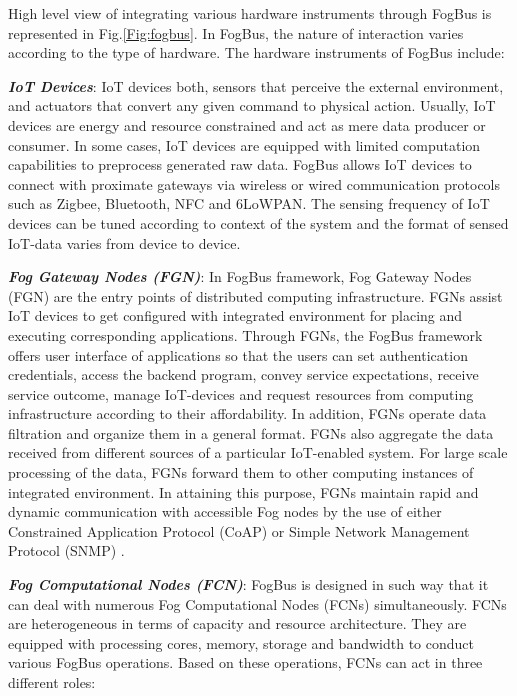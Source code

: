 \documentclass[final,5p,times,twocolumn]{elsarticle}
\begin{document}
%
High level view of integrating various hardware instruments through FogBus is represented in Fig.\ref{Fig:fogbus}. In FogBus, the nature of interaction varies according to the type of hardware. The hardware instruments of FogBus include:
\par \textbf{\textit{IoT Devices}}: IoT devices both, sensors that perceive the external environment, and actuators that convert any given command to physical action. Usually, IoT devices are energy and resource constrained and act as mere data producer or consumer. In some cases, IoT devices are equipped with limited computation capabilities to preprocess generated raw data. FogBus allows IoT devices to connect with proximate gateways via wireless or wired communication protocols such as Zigbee, Bluetooth, NFC and 6LoWPAN. The sensing frequency of IoT devices can be tuned according to context of the system and the format of sensed IoT-data varies from device to device.     
%  
\par \textbf{\textit{Fog Gateway Nodes (FGN)}}: In FogBus framework, Fog Gateway Nodes (FGN) are the entry points of distributed computing infrastructure. FGNs assist IoT devices to get configured with integrated environment for placing and executing corresponding applications. Through FGNs, the FogBus framework offers user interface of applications so that the users can set authentication credentials, access the backend program, convey service expectations, receive service outcome, manage IoT-devices and request resources from computing infrastructure according to their affordability. In addition, FGNs operate data filtration and organize them in a general format. FGNs also aggregate the data received from different sources of a particular IoT-enabled system. For large scale processing of the data, FGNs forward them to other computing instances of integrated environment. In attaining this purpose, FGNs maintain rapid and dynamic communication with accessible Fog nodes by the use of either Constrained Application Protocol (CoAP) or Simple Network Management Protocol (SNMP) \cite{protocols}.   
%    
\par \textbf{\textit{Fog Computational Nodes (FCN)}}: FogBus is designed in such way that it can deal with numerous Fog Computational Nodes (FCNs) simultaneously. FCNs are heterogeneous in terms of capacity and resource architecture. They are equipped with processing cores, memory, storage and bandwidth to conduct various FogBus operations. Based on these operations, FCNs can act in three different roles:       
\end{document}
